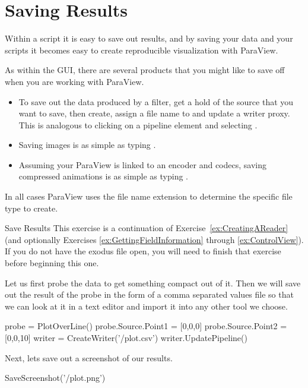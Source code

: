 \section{Saving Results}
\label{sec:Saving}

Within a script it is easy to save out results, and by saving your data and
your scripts it becomes easy to create reproducible visualization with
ParaView.

As within the GUI, there are several products that you might like to save off when you are working with ParaView.
\begin{itemize}
\item To save out the data produced by a filter, get a hold of the source that you want to save, then create, assign a file name to and update a writer proxy.
This is analogous to clicking on a pipeline element and selecting .
\item Saving images is as simple as typing .
\item Assuming your ParaView is linked to an encoder and codecs, saving
compressed animations is as simple as typing
.
\end{itemize}
In all cases ParaView uses the file name extension to determine the specific file type to create.

\begin{exercise}{Save Results}
  \label{ex:SaveResults}%
  This exercise is a continuation of Exercise~\ref{ex:CreatingAReader} (and
  optionally Exercises \ref{ex:GettingFieldInformation} through
  \ref{ex:ControlView}). If you do not have the exodus file open, you will
  need to finish that exercise before beginning this one.

  Let us first probe the data to get something compact out of it. Then we will save out the result of the probe in the form of a comma separated values file so that we can look at it in a text editor and import it into any other tool we choose.

  \begin{pythonpluscommands}
probe = PlotOverLine()
probe.Source.Point1 = [0,0,0]
probe.Source.Point2 = [0,0,10]
writer = CreateWriter('/plot.csv')
writer.UpdatePipeline()
  \end{pythonpluscommands}

  Next, lets save out a screenshot of our results.
  \begin{pythonpluscommands}
SaveScreenshot('/plot.png')
  \end{pythonpluscommands}
\end{exercise}

